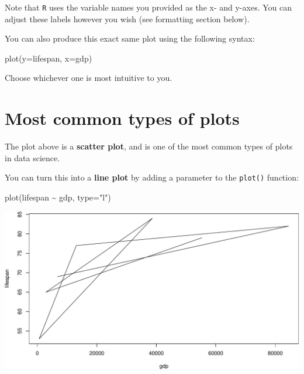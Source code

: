 \documentclass[
]{book}
\newenvironment{Shaded}{\begin{snugshade}}{\end{snugshade}}
\newcommand{\AttributeTok}[1]{\textcolor[rgb]{0.77,0.63,0.00}{#1}}
\newcommand{\FunctionTok}[1]{\textcolor[rgb]{0.00,0.00,0.00}{#1}}
\newcommand{\NormalTok}[1]{#1}
\newcommand{\SpecialCharTok}[1]{\textcolor[rgb]{0.00,0.00,0.00}{#1}}
\newcommand{\StringTok}[1]{\textcolor[rgb]{0.31,0.60,0.02}{#1}}
\begin{document}
Note that \texttt{R} uses the variable names you provided as the x- and y-axes. You can adjust these labels however you wish (see formatting section below).

You can also produce this exact same plot using the following syntax:

\begin{Shaded}
\begin{Highlighting}[]
\FunctionTok{plot}\NormalTok{(}\AttributeTok{y=}\NormalTok{lifespan, }\AttributeTok{x=}\NormalTok{gdp)}
\end{Highlighting}
\end{Shaded}

Choose whichever one is most intuitive to you.

\hypertarget{most-common-types-of-plots}{%
\section*{Most common types of plots}\label{most-common-types-of-plots}}

The plot above is a \textbf{scatter plot}, and is one of the most common types of plots in data science.

You can turn this into a \textbf{line plot} by adding a parameter to the \texttt{plot()} function:

\begin{Shaded}
\begin{Highlighting}[]
\FunctionTok{plot}\NormalTok{(lifespan }\SpecialCharTok{\textasciitilde{}}\NormalTok{ gdp, }\AttributeTok{type=}\StringTok{"l"}\NormalTok{)}
\end{Highlighting}
\end{Shaded}

\includegraphics{figures/unnamed-chunk-97-1.pdf}
\end{document}
